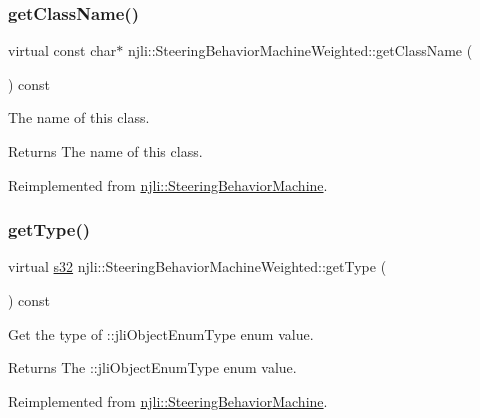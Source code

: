 \subsubsection{\texorpdfstring{get\+Class\+Name()}{getClassName()}}
{\footnotesize\ttfamily virtual const char$\ast$ njli\+::\+Steering\+Behavior\+Machine\+Weighted\+::get\+Class\+Name (\begin{DoxyParamCaption}{ }\end{DoxyParamCaption}) const\hspace{0.3cm}{\ttfamily [virtual]}}

The name of this class.

\begin{DoxyReturn}{Returns}
The name of this class. 
\end{DoxyReturn}


Reimplemented from \mbox{\hyperlink{classnjli_1_1_steering_behavior_machine_a62b8ba5c3e2b9f63eb146721c03d37a1}{njli\+::\+Steering\+Behavior\+Machine}}.

\mbox{\label{classnjli_1_1_steering_behavior_machine_weighted_a4d9fcf0548dc29c760dad537716c645e}} 
\subsubsection{\texorpdfstring{get\+Type()}{getType()}}
{\footnotesize\ttfamily virtual \mbox{\hyperlink{_util_8h_aa62c75d314a0d1f37f79c4b73b2292e2}{s32}} njli\+::\+Steering\+Behavior\+Machine\+Weighted\+::get\+Type (\begin{DoxyParamCaption}{ }\end{DoxyParamCaption}) const\hspace{0.3cm}{\ttfamily [virtual]}}

Get the type of \+::jli\+Object\+Enum\+Type enum value.

\begin{DoxyReturn}{Returns}
The \+::jli\+Object\+Enum\+Type enum value. 
\end{DoxyReturn}


Reimplemented from \mbox{\hyperlink{classnjli_1_1_steering_behavior_machine_a9daddfcf84380483cd2643c15d0497a4}{njli\+::\+Steering\+Behavior\+Machine}}.


